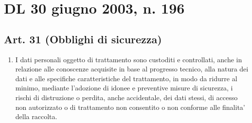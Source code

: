 \section*{DL 30 giugno 2003, n. 196}
\subsection*{Art. 31 (Obblighi di sicurezza)}\label{sec:allegatoArt31DL30giugno2003n196}
\begin{enumerate}
	\item I dati  personali  oggetto  di  trattamento  sono  custoditi  e
	controllati, anche in relazione alle conoscenze acquisite in base  al
	progresso  tecnico,  alla  natura  dei   dati   e   alle   specifiche
	caratteristiche del  trattamento,  in  modo  da  ridurre  al  minimo,
	mediante l'adozione di idonee e preventive  misure  di  sicurezza,  i
	rischi di distruzione o perdita, anche accidentale, dei dati  stessi,
	di accesso non autorizzato o di  trattamento  non  consentito  o  non
	conforme alle finalita' della raccolta.
\end{enumerate}